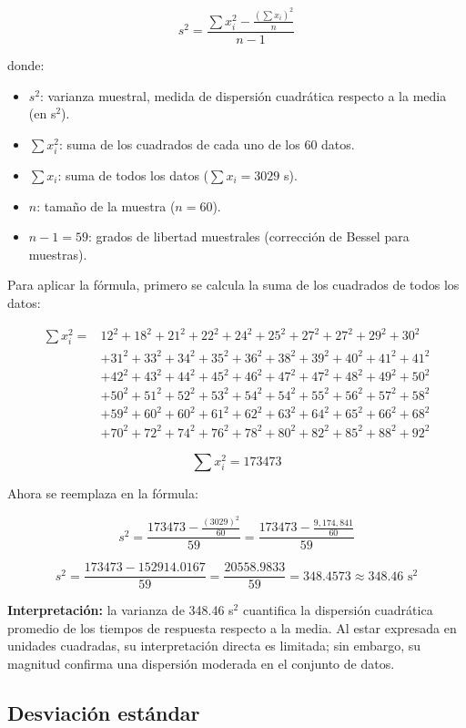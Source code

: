\documentclass[12pt,letterpaper]{article}
\begin{document}
\[
s^2=\frac{\sum x_i^2-\frac{(\sum x_i)^2}{n}}{n-1}
\]

donde:
\begin{itemize}[leftmargin=1.2cm]
    \item $s^2$: varianza muestral, medida de dispersión cuadrática respecto a la media (en s$^2$).
    \item $\sum x_i^2$: suma de los cuadrados de cada uno de los 60 datos.
    \item $\sum x_i$: suma de todos los datos ($\sum x_i = 3029$ s).
    \item $n$: tamaño de la muestra ($n = 60$).
    \item $n-1 = 59$: grados de libertad muestrales (corrección de Bessel para muestras).
\end{itemize}

Para aplicar la fórmula, primero se calcula la suma de los cuadrados de todos los datos:

\begin{align*}
\sum x_i^2 = &12^2+18^2+21^2+22^2+24^2+25^2+27^2+27^2+29^2+30^2 \\
&+31^2+33^2+34^2+35^2+36^2+38^2+39^2+40^2+41^2+41^2 \\
&+42^2+43^2+44^2+45^2+46^2+47^2+47^2+48^2+49^2+50^2 \\
&+50^2+51^2+52^2+53^2+54^2+54^2+55^2+56^2+57^2+58^2 \\
&+59^2+60^2+60^2+61^2+62^2+63^2+64^2+65^2+66^2+68^2 \\
&+70^2+72^2+74^2+76^2+78^2+80^2+82^2+85^2+88^2+92^2
\end{align*}

\[
\sum x_i^2 = 173473
\]

Ahora se reemplaza en la fórmula:

\[
s^2=\frac{173473-\frac{(3029)^2}{60}}{59}=\frac{173473-\frac{9{,}174{,}841}{60}}{59}
\]

\[
s^2=\frac{173473-152914.0167}{59}=\frac{20558.9833}{59}=348.4573 \approx 348.46 \text{ s}^2
\]

\textbf{Interpretación:} la varianza de 348.46 s$^2$ cuantifica la dispersión cuadrática promedio de los tiempos de respuesta respecto a la media. Al estar expresada en unidades cuadradas, su interpretación directa es limitada; sin embargo, su magnitud confirma una dispersión moderada en el conjunto de datos.

\subsection{Desviación estándar}
\end{document}
